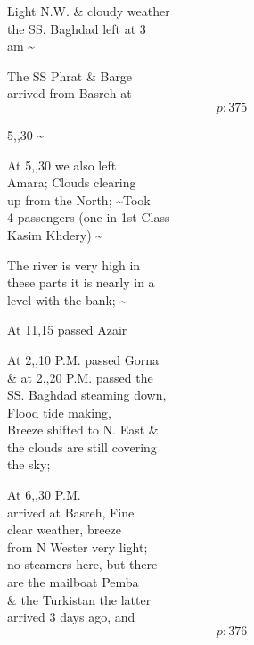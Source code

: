 \documentclass{report}
\begin{document}
	\par{
 	Light N.W. \& cloudy weather\ \\the SS. Baghdad left at 3\ \\am \~{}\ \\
	}

	\par{
 	The SS Phrat \& Barge\ \\arrived from Basreh at\ \\
  \[p: 375 \]

	}



	\par{
 	5,,30 \~{}\ \\
	}

	\par{
 	At 5,,30 we also left\ \\Amara; Clouds clearing\ \\up from the North; \~{}Took\ \\4 passengers (one in 1st Class\ \\Kasim Khdery) \~{}\ \\
	}

	\par{
 	The river is very high in\ \\these parts it is nearly in a\ \\level with the bank; \~{}\ \\
	}

	\par{
 	At 11,15 passed Azair\ \\
	}

	\par{
 	At 2,,10 P.M. passed Gorna\ \\\& at 2,,20 P.M. passed the\ \\SS. Baghdad steaming down,\ \\Flood tide making,\ \\Breeze shifted to N. East \&\ \\the clouds are still covering\ \\the sky;\ \\
	}

	\par{
 	At 6,,30 P.M.\ \\arrived at Basreh, Fine\ \\clear weather, breeze\ \\from N Wester very light;\ \\no steamers here, but there\ \\are the mailboat Pemba\ \\\& the Turkistan the latter\ \\arrived 3 days ago, and\ \\
  \[p: 376 \]

	}
\end{document}
